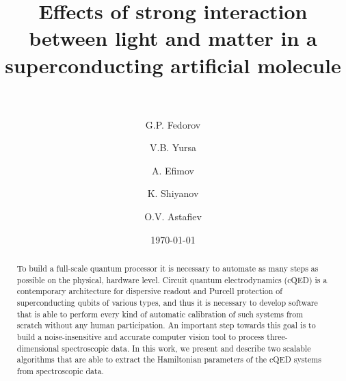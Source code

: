 \documentclass[%
 aip,
 amsmath,amssymb,
 reprint,%
]{revtex4-1}
\newcommand{\mytitile}{Effects of strong interaction between light and matter in a superconducting artificial molecule}
\begin{document}
	
	\title[\mytitile]{\mytitile\\~}
	
	\author{G.P. Fedorov}
	
	
	\author{V.B. Yursa}
	
	\author{A. Efimov}
	

	\author{K. Shiyanov}


	\author{O.V. Astafiev}
	
	
	\date{\today}%
	
	
	\begin{abstract}
		To build a full-scale quantum processor it is necessary to automate as many steps as possible on the physical, hardware level. Circuit quantum electrodynamics (cQED) is a contemporary architecture for dispersive readout and Purcell protection of superconducting qubits of various types, and thus it is necessary to develop software that is able to perform every kind of automatic calibration of such systems from scratch without any human participation. An important step towards this goal is to build a noise-insensitive and accurate computer vision tool to process three-dimensional spectroscopic data. In this work, we present and describe two scalable algorithms that are able to extract the Hamiltonian parameters of the cQED systems from spectroscopic data. 
	\end{abstract}
	
	\maketitle
\end{document}
